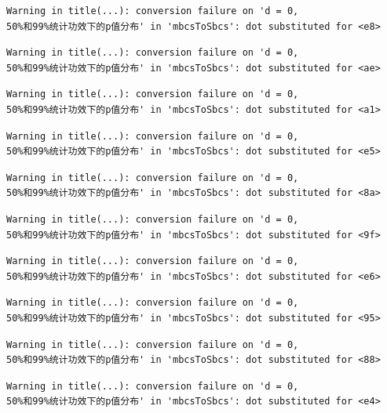 \documentclass[
  letterpaper,
  DIV=11,
  numbers=noendperiod]{scrreprt}
\begin{document}
\begin{verbatim}
Warning in title(...): conversion failure on 'd = 0,
50%和99%统计功效下的p值分布' in 'mbcsToSbcs': dot substituted for <e8>
\end{verbatim}

\begin{verbatim}
Warning in title(...): conversion failure on 'd = 0,
50%和99%统计功效下的p值分布' in 'mbcsToSbcs': dot substituted for <ae>
\end{verbatim}

\begin{verbatim}
Warning in title(...): conversion failure on 'd = 0,
50%和99%统计功效下的p值分布' in 'mbcsToSbcs': dot substituted for <a1>
\end{verbatim}

\begin{verbatim}
Warning in title(...): conversion failure on 'd = 0,
50%和99%统计功效下的p值分布' in 'mbcsToSbcs': dot substituted for <e5>
\end{verbatim}

\begin{verbatim}
Warning in title(...): conversion failure on 'd = 0,
50%和99%统计功效下的p值分布' in 'mbcsToSbcs': dot substituted for <8a>
\end{verbatim}

\begin{verbatim}
Warning in title(...): conversion failure on 'd = 0,
50%和99%统计功效下的p值分布' in 'mbcsToSbcs': dot substituted for <9f>
\end{verbatim}

\begin{verbatim}
Warning in title(...): conversion failure on 'd = 0,
50%和99%统计功效下的p值分布' in 'mbcsToSbcs': dot substituted for <e6>
\end{verbatim}

\begin{verbatim}
Warning in title(...): conversion failure on 'd = 0,
50%和99%统计功效下的p值分布' in 'mbcsToSbcs': dot substituted for <95>
\end{verbatim}

\begin{verbatim}
Warning in title(...): conversion failure on 'd = 0,
50%和99%统计功效下的p值分布' in 'mbcsToSbcs': dot substituted for <88>
\end{verbatim}

\begin{verbatim}
Warning in title(...): conversion failure on 'd = 0,
50%和99%统计功效下的p值分布' in 'mbcsToSbcs': dot substituted for <e4>
\end{verbatim}
\end{document}
